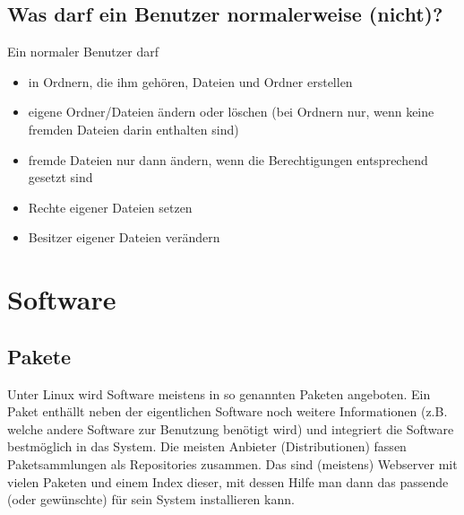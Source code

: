 \documentclass[a4paper,12pt]{article}
\begin{document}
\subsection{Was darf ein Benutzer normalerweise (nicht)?}
Ein normaler Benutzer darf 
\begin{itemize}
\item in Ordnern, die ihm gehören, Dateien und Ordner erstellen
\item eigene Ordner/Dateien ändern oder löschen (bei Ordnern nur, wenn 
keine fremden Dateien darin enthalten sind)
\item fremde Dateien nur dann ändern, wenn die Berechtigungen entsprechend gesetzt sind
\item Rechte eigener Dateien setzen
\item Besitzer eigener Dateien verändern
\end{itemize}

\section{Software}
\subsection{Pakete}
Unter Linux wird Software meistens in so genannten Paketen angeboten. 
Ein Paket enthällt neben der eigentlichen Software noch weitere 
Informationen (z.B. welche andere Software zur Benutzung benötigt wird) 
und integriert die Software bestmöglich in das System. Die meisten 
Anbieter (Distributionen) fassen Paketsammlungen als Repositories zusammen. 
Das sind (meistens) Webserver mit vielen Paketen und einem Index dieser, 
mit dessen Hilfe man dann das passende (oder gewünschte) für sein System
installieren kann.
\end{document}
